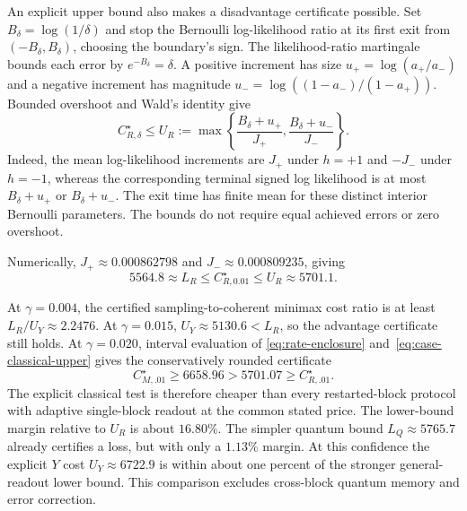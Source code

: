 \documentclass[11pt,a4paper]{article}
\theoremstyle{definition}
\theoremstyle{remark}
\numberwithin{equation}{section}
\begin{document}
An explicit upper bound also makes a disadvantage certificate possible.
Set $B_\delta=\log(1/\delta)$ and stop the Bernoulli log-likelihood ratio
at its first exit from $(-B_\delta,B_\delta)$, choosing the boundary's
sign. The likelihood-ratio martingale bounds each error by
$e^{-B_\delta}=\delta$. A positive increment has size
$u_+=\log(a_+/a_-)$ and a negative increment has magnitude
$u_-=\log((1-a_-)/(1-a_+))$. Bounded overshoot and Wald's identity give
\begin{equation}\label{eq:case-classical-upper}
 C_{R,\delta}^\star\leq
 U_R:=\max\left\{\frac{B_\delta+u_+}{J_+},
                  \frac{B_\delta+u_-}{J_-}\right\}.
\end{equation}
Indeed, the mean log-likelihood increments are $J_+$ under $h=+1$
and $-J_-$ under $h=-1$, whereas the corresponding terminal signed
log likelihood is at most $B_\delta+u_+$ or $B_\delta+u_-$.
The exit time has finite mean for these distinct interior Bernoulli
parameters. The bounds do not require equal achieved errors or zero
overshoot.

Numerically, $J_+\approx0.000862798$ and
$J_-\approx0.000809235$, giving
\begin{equation}\label{eq:case-classical-values}
 5564.8\approx L_R\leq C_{R,0.01}^\star\leq U_R\approx5701.1.
\end{equation}

\begin{samepage}
At $\gamma=0.004$, the certified sampling-to-coherent minimax cost
ratio is at least $L_R/U_Y\approx2.2476$. At $\gamma=0.015$,
$U_Y\approx5130.6<L_R$, so the advantage certificate still holds.
At $\gamma=0.020$, interval evaluation of
\eqref{eq:rate-enclosure} and~\eqref{eq:case-classical-upper} gives the
conservatively rounded certificate
\begin{equation}\label{eq:strong-loss}
 \boxed{C_{M,.01}^\star\geq6658.96>5701.07\geq C_{R,.01}^\star.}
\end{equation}
The explicit classical test is therefore cheaper than every restarted-block
protocol with adaptive single-block readout at the common stated price.
The lower-bound margin relative to $U_R$ is about $16.80\%$.
The simpler quantum bound $L_Q\approx5765.7$ already certifies a loss,
but with only a $1.13\%$ margin. At this confidence the explicit
$Y$ cost $U_Y\approx6722.9$ is within about one percent of the stronger
general-readout lower bound. This comparison excludes cross-block
quantum memory and error correction.\par
\end{samepage}
\end{document}

